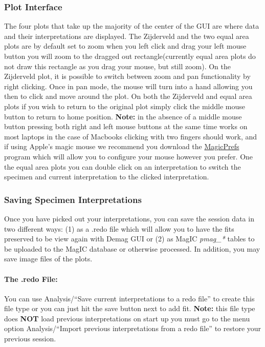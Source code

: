 \documentclass[11pt]{book}
\begin{document}
\subsubsection{Plot Interface}\label{plot-interface}

The four plots that take up the majority of the center of the GUI are where data and their interpretations are displayed. The Zijderveld and the two equal area plots are by default set to zoom when you left click and drag your left mouse button you will zoom to the dragged out rectangle(currently equal area plots do not draw this rectangle as you drag your mouse, but still zoom). On the Zijderveld plot, it is possible to switch between zoom and pan functionality by right clicking. Once in pan mode, the mouse will turn into a hand allowing you then to click and move around the plot. On both the Zijderveld and equal area plots if you wish to return to the original plot simply click the middle mouse button to return to home position. \textbf{Note:} in the absence of a middle mouse button pressing both right and left mouse buttons at the same time works on most laptops in the case of Macbooks clicking with two fingers should work, and if using Apple's magic mouse we recommend you download the \href{http://magicprefs.com/}{MagicPrefs} program which will allow you to configure your mouse however you prefer. One the equal area plots you can double click on an interpretation to switch the specimen and current interpretation to the clicked interpretation.

\subsubsection{Saving Specimen Interpretations}\label{saving-specimen-interpretations}

Once you have picked out your interpretations, you can save the session data in two different ways: (1) as a .redo file which will allow you to have the fits preserved to be view again with Demag GUI or (2) as MagIC {\it pmag\_*} tables to be uploaded to the MagIC database or otherwise processed. In addition, you may save image files of the plots.

\paragraph{The .redo File:}\label{the-.redo-file}

You can use Analysis/``Save current interpretations to a redo file'' to create this file type or you can just hit the save button next to add fit. \textbf{Note:} this file type does \textbf{NOT} load previous interpretations on start up you must go to the menu option Analysis/``Import previous interpretations from a redo file'' to restore your previous session.
\end{document}
